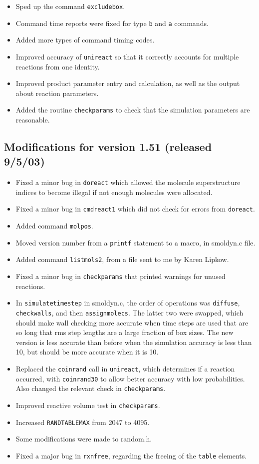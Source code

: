 \documentclass {scrbook}
\newcommand {\ttt} {\texttt}
\begin{document}
\begin{itemize}
\item Sped up the command \ttt{excludebox}.
\item Command time reports were fixed for type \ttt{b} and \ttt{a} commands.
\item Added more types of command timing codes.
\item Improved accuracy of \ttt{unireact} so that it correctly accounts for multiple reactions from one identity.
\item Improved product parameter entry and calculation, as well as the output about reaction parameters.
\item Added the routine \ttt{checkparams} to check that the simulation parameters are reasonable.
\end{itemize}

\subsection{Modifications for version 1.51 (released 9/5/03)}
\begin{itemize}
\item Fixed a minor bug in \ttt{doreact} which allowed the molecule superstructure indices to become illegal if not enough molecules were allocated.
\item Fixed a minor bug in \ttt{cmdreact1} which did not check for errors from \ttt{doreact}.
\item Added command \ttt{molpos}.
\item Moved version number from a \ttt{printf} statement to a macro, in smoldyn.c file.
\item Added command \ttt{listmols2}, from a file sent to me by Karen Lipkow.
\item Fixed a minor bug in \ttt{checkparams} that printed warnings for unused reactions.
\item In \ttt{simulatetimestep} in smoldyn.c, the order of operations was \ttt{diffuse}, \ttt{checkwalls}, and then \ttt{assignmolecs}. The latter two were swapped, which should make wall checking more accurate when time steps are used that are so long that rms step lengths are a large fraction of box sizes. The new version is less accurate than before when the simulation accuracy is less than 10, but should be more accurate when it is 10.
\item Replaced the \ttt{coinrand} call in \ttt{unireact}, which determines if a reaction occurred, with \ttt{coinrand30} to allow better accuracy with low probabilities. Also changed the relevant check in \ttt{checkparams}.
\item Improved reactive volume test in \ttt{checkparams}.
\item Increased \ttt{RANDTABLEMAX} from 2047 to 4095.
\item Some modifications were made to random.h.
\item Fixed a major bug in \ttt{rxnfree}, regarding the freeing of the \ttt{table} elements.
\end{itemize}
\end{document}
